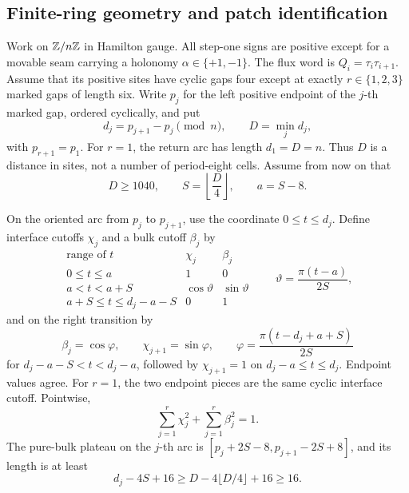 \subsection{Finite-ring geometry and patch identification}

Work on \(\mathbb Z/n\mathbb Z\) in Hamilton gauge.  All step-one signs are positive
except for a movable seam carrying a holonomy
\(\alpha\in\{+1,-1\}\).  The flux word is
\(Q_i=\tau_i\tau_{i+1}\).  Assume that its positive sites have cyclic gaps
four except at exactly \(r\in\{1,2,3\}\) marked gaps of length six.  Write
\(p_j\) for the left positive endpoint of the \(j\)-th marked gap, ordered
cyclically, and put
\begin{equation}
 d_j=p_{j+1}-p_j\pmod n,\qquad D=\min_j d_j,
 \label{eq:separation}
\end{equation}
with \(p_{r+1}=p_1\).  For \(r=1\), the return arc has length \(d_1=D=n\).
Thus \(D\) is a distance in sites, not a number of period-eight cells.
Assume from now on that
\begin{equation}
 D\geq1040,\qquad S=\left\lfloor\frac D4\right\rfloor,
 \qquad a=S-8.
 \label{eq:S}
\end{equation}

On the oriented arc from \(p_j\) to \(p_{j+1}\), use the coordinate
\(0\leq t\leq d_j\).  Define interface cutoffs \(\chi_j\) and a bulk cutoff
\(\beta_j\) by
\begin{equation}
\begin{array}{c|cc}
\text{range of }t&\chi_j&\beta_j\\ \hline
0\leq t\leq a&1&0\\
a<t<a+S&\cos\vartheta&\sin\vartheta\\
a+S\leq t\leq d_j-a-S&0&1
\end{array}
\qquad
 \vartheta=\frac{\pi(t-a)}{2S},
 \label{eq:left-cutoff}
\end{equation}
and on the right transition by
\begin{equation}
 \beta_j=\cos\varphi,\qquad \chi_{j+1}=\sin\varphi,\qquad
 \varphi=\frac{\pi(t-d_j+a+S)}{2S}
 \label{eq:right-cutoff}
\end{equation}
for \(d_j-a-S<t<d_j-a\), followed by \(\chi_{j+1}=1\) on
\(d_j-a\leq t\leq d_j\).  Endpoint values agree.  For \(r=1\), the two
endpoint pieces are the same cyclic interface cutoff.  Pointwise,
\begin{equation}
 \sum_{j=1}^r\chi_j^2+\sum_{j=1}^r\beta_j^2=1.
 \label{eq:partition}
\end{equation}
The pure-bulk plateau on the \(j\)-th arc is
\([p_j+2S-8,p_{j+1}-2S+8]\), and its length is at least
\begin{equation}
 d_j-4S+16\geq D-4\lfloor D/4\rfloor+16\geq16.
 \label{eq:bulk-plateau}
\end{equation}

